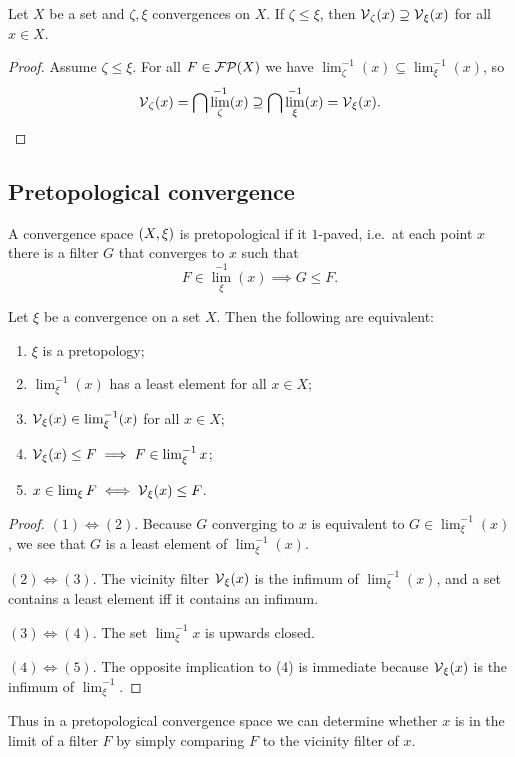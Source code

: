 \begin{lemma} \label{vicinityMapAntitone}
Let $X$ be a set and $\zeta, \xi$ convergences on $X$. If $\zeta \leq \xi$, then $\operatorname{\mathcal{V}}_\zeta(x) \supseteq \operatorname{\mathcal{V}}_\xi(x)$ for all $x\in X$.
\end{lemma}
\begin{proof}
Assume $\zeta \leq \xi$. For all $F\in \operatorname{\mathcal{FP}}(X)$ we have $\lim_\zeta^{-1}(x) \subseteq \lim_\xi^{-1}(x)$, so
\[ \operatorname{\mathcal{V}}_\zeta(x) = \bigcap \lim_\zeta^{-1}(x) \supseteq \bigcap \lim_\xi^{-1}(x) = \operatorname{\mathcal{V}}_\xi(x). \]
\end{proof}

\subsection{Pretopological convergence}
A convergence space $\left( X,\xi \right)$ is pretopological if it $1$-paved, i.e.\ at each point $x$ there is a filter $G$ that converges to $x$ such that
\[ F\in {\lim}_\xi^{-1}(x) \implies G \leq F. \]

\begin{lemma}
Let $\xi$ be a convergence on a set $X$. Then the following are equivalent:
\begin{enumerate}
\item $\xi$ is a pretopology;
\item $\lim_\xi^{-1}(x)$ has a least element for all $x\in X$;
\item $\operatorname{\mathcal{V}}_\xi(x) \in \lim_\xi^{-1}(x)$ for all $x\in X$;
\item $\operatorname{\mathcal{V}}_\xi(x) \leq F \implies F\in\lim^{-1}_\xi x$;
\item $x\in\lim_\xi F \iff \operatorname{\mathcal{V}}_\xi(x) \leq F$.
\end{enumerate}
\end{lemma}
\begin{proof}
$(1) \Leftrightarrow (2)$. Because $G$ converging to $x$ is equivalent to $G\in \lim_\xi^{-1}(x)$, we see that $G$ is a least element of $\lim_\xi^{-1}(x)$.

$(2) \Leftrightarrow (3)$. The vicinity filter $\operatorname{\mathcal{V}}_\xi(x)$ is the infimum of $\lim_\xi^{-1}(x)$, and a set contains a least element iff it contains an infimum.

$(3) \Leftrightarrow (4)$. The set $\lim^{-1}_\xi x$ is upwards closed.

$(4) \Leftrightarrow (5)$. The opposite implication to (4) is immediate because $\operatorname{\mathcal{V}}_\xi(x)$ is the infimum of $\lim^{-1}_\xi$.
\end{proof}
Thus in a pretopological convergence space we can determine whether $x$ is in the limit of a filter $F$ by simply comparing $F$ to the vicinity filter of $x$.

